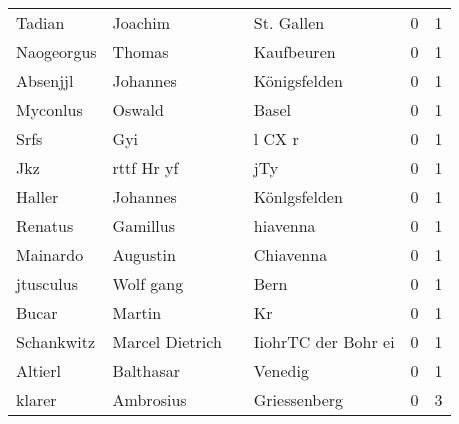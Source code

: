 \begin{tabular}{llllrr}
                   Tadian &                            Joachim &             &                                  St. Gallen &          0 &         1 \\
               Naogeorgus &                             Thomas &             &                                  Kaufbeuren &          0 &         1 \\
                 Absenjjl &                           Johannes &             &                                Königsfelden &          0 &         1 \\
                 Myconlus &                             Oswald &             &                                       Basel &          0 &         1 \\
                     Srfs &                                Gyi &             &                                      l CX r &          0 &         1 \\
                      Jkz &                         rttf Hr yf &             &                                         jTy &          0 &         1 \\
                   Haller &                           Johannes &             &                                Könlgsfelden &          0 &         1 \\
                  Renatus &                           Gamillus &             &                                    hiavenna &          0 &         1 \\
                 Mainardo &                           Augustin &             &                                   Chiavenna &          0 &         1 \\
                jtusculus &                          Wolf gang &             &                                        Bern &          0 &         1 \\
                    Bucar &                             Martin &             &                                          Kr &          0 &         1 \\
               Schankwitz &                    Marcel Dietrich &             &                         IiohrTC der Bohr ei &          0 &         1 \\
                  Altierl &                          Balthasar &             &                                     Venedig &          0 &         1 \\
                   klarer &                          Ambrosius &             &                                Griessenberg &          0 &         3 \\

\end{tabular}
